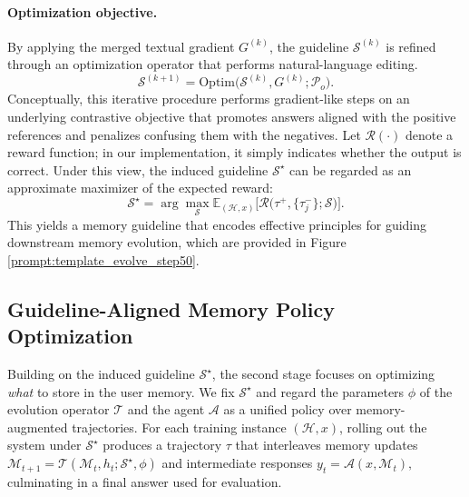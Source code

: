 \paragraph{Optimization objective.}
By applying the merged textual gradient \(G^{(k)}\), the guideline \(\mathcal{S}^{(k)}\) is refined through an optimization operator that performs natural-language editing.
\begin{equation}
\mathcal{S}^{(k+1)} = \mathrm{Optim}\big(\mathcal{S}^{(k)}, G^{(k)};\mathcal{P}_o\big).
\end{equation}
Conceptually, this iterative procedure performs gradient-like steps on an underlying contrastive objective that promotes answers aligned with the positive references and penalizes confusing them with the negatives. Let \(\mathcal{R}(\cdot)\) denote a reward function; in our implementation, it simply indicates whether the output is correct. Under this view, the induced guideline \(\mathcal{S}^\star\) can be regarded as an approximate maximizer of the expected reward:
\begin{equation} 
\mathcal{S}^{\star}
= \arg\max_{\mathcal{S}}
\mathbb{E}_{(\mathcal{H}, x)}
\Big[
\mathcal{R}\big(\tau^{+}, \{\tau_j^{-}\} ; \mathcal{S}\big)
\Big].
\end{equation}
This yields a memory guideline that encodes effective principles for guiding downstream memory evolution, which are provided in Figure \ref{prompt:template_evolve_step50}.



\subsection{Guideline-Aligned Memory Policy Optimization}

Building on the induced guideline \( \mathcal{S}^\star \), the second stage focuses on optimizing \emph{what} to store in the user memory. We fix \( \mathcal{S}^\star \) and regard the parameters \( \phi \) of the evolution operator \( \mathcal{T} \) and the agent \( \mathcal{A} \) as a unified policy over memory-augmented trajectories. For each training instance \((\mathcal{H}, x)\), rolling out the system under \( \mathcal{S}^\star \) produces a trajectory \(\tau\) that interleaves memory updates
\(
\mathcal{M}_{t+1} = \mathcal{T}(\mathcal{M}_t, h_t ; \mathcal{S}^\star, \phi)
\)
and intermediate responses
\(
y_t = \mathcal{A}(x, \mathcal{M}_t),
\)
culminating in a final answer used for evaluation.

